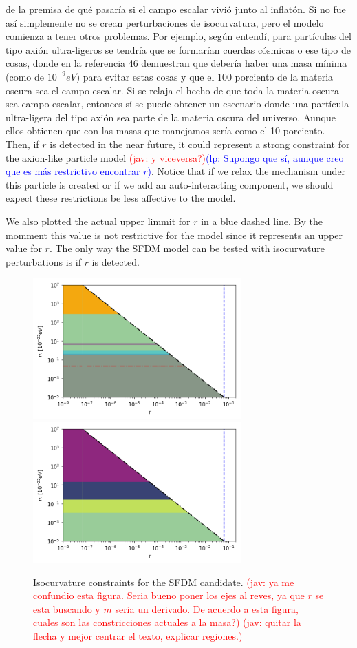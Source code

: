\documentclass[amssymb,twocolumn,prd,nofootinbib,showpacs]{revtex4-1}
\newcommand{\jav}[1]{\textcolor{red}{(jav: #1)}}
\newcommand{\lp}[1]{\textcolor{blue}{(lp: #1)}}
\begin{document}
{de  la  premisa  de  qu\'e  pasar\'ia  si  el  campo  escalar  vivi\'o junto al inflat\'on.  Si no fue as\'i simplemente no se crean perturbaciones de isocurvatura, pero el modelo comienza a  tener  otros  problemas.   Por  ejemplo,  seg\'un  entend\'i, para part\'iculas del tipo axi\'on ultra-ligeros se tendr\'ia que se formar\'ian cuerdas c\'osmicas o ese tipo de cosas, donde en  la  referencia  46  demuestran  que  deber\'ia  haber  una masa m\'inima (como de $10^{−9}eV$) para evitar estas cosas y que el 100 porciento de la materia oscura sea el campo escalar.  Si se relaja el hecho de que toda la materia oscura sea campo escalar, entonces s\'i se puede obtener un escenario donde una part\'icula ultra-ligera del tipo axi\'on sea parte de la materia oscura del universo.  Aunque ellos obtienen que con las masas que manejamos ser\'ia como el 10 porciento.} Then, if $r$ is detected in the near future, it could represent a strong constraint for the axion-like particle model \jav{y viceversa?}\lp{Supongo que s\'i, aunque creo que es m\'as restrictivo encontrar $r$}. 
 Notice that if we relax the mechanism under this particle is created or if we add an 
 auto-interacting component, we should expect these restrictions be less affective to the model. 

We also plotted the actual upper limmit for $r$ in a blue dashed line. By the momment this value is not restrictive for the model since it represents an upper value for $r$. The only way the SFDM model can be tested with
isocurvature perturbations is if $r$ is detected.
\begin{figure}[h!]
\includegraphics[width=8cm]{SFDMconstraints.png}
\includegraphics[width=8cm]{SFDMconstraints2.png}
\caption{Isocurvature constraints for the SFDM candidate.
\jav{ya me confundio esta figura. Seria bueno poner los ejes al reves, ya que $r$ se esta buscando 
y $m$ seria un derivado. De acuerdo a esta figura, cuales son las constricciones actuales a la masa?}
\jav{quitar la flecha y mejor centrar el texto, explicar regiones.}
}\label{constraintsSFDM}
\end{figure}
\end{document}
